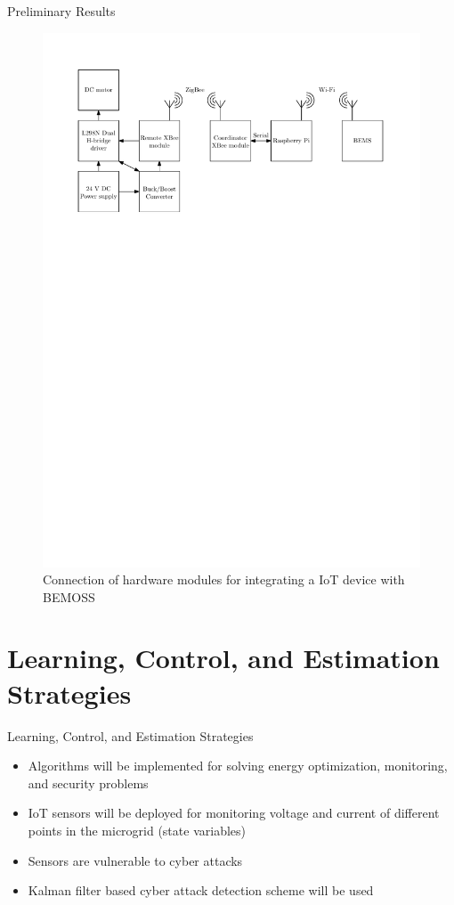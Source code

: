 \documentclass{beamer}
\begin{document}
\begin{frame}{Preliminary Results}
\begin{figure}
\includegraphics[scale=0.6]{figs/ipe/motorSetup}
\caption{Connection of hardware modules for integrating a IoT device with BEMOSS}
\end{figure}
\end{frame}

\section{Learning, Control, and Estimation Strategies}
\begin{frame}{Learning, Control, and Estimation Strategies}
\begin{itemize}
\item Algorithms will be implemented for solving energy optimization, monitoring, and security problems
\item IoT sensors will be deployed for monitoring voltage and current of different points in the microgrid (state variables)
\item Sensors are vulnerable to cyber attacks 
\item Kalman filter based cyber attack detection scheme will be used
\end{itemize}
\end{frame}
\end{document}
